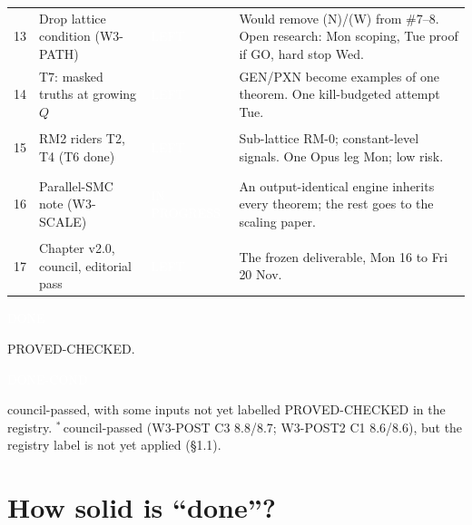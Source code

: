 \documentclass[11pt,a4paper]{article}
\newcommand{\badge}[2]{\colorbox{#1}{\textcolor{white}{\sffamily\scriptsize\bfseries\strut #2}}}
\newcommand{\DONE}{\badge{done}{DONE}}
\newcommand{\DONEC}{\badge{cond}{DONE-COND}}
\newcommand{\PROG}{\badge{prog}{IN PROGRESS}}
\newcommand{\LEFT}{\badge{left}{LEFT}}
\theoremstyle{definition}
\begin{document}
{\begin{tabularx}{\linewidth}{@{}r >{\raggedright\arraybackslash}p{4.6cm} l >{\raggedright\arraybackslash}X@{}}
13 & Drop lattice condition (W3-PATH) & \LEFT & Would remove (N)/(W) from \#7--8. Open research: Mon scoping, Tue proof if GO, hard stop Wed.\\
14 & T7: masked truths at growing $Q$ & \LEFT & GEN/PXN become examples of one theorem. One kill-budgeted attempt Tue.\\
15 & RM2 riders T2, T4 (T6 done) & \LEFT & Sub-lattice RM-0; constant-level signals. One Opus leg Mon; low risk.\\
16 & Parallel-SMC note (W3-SCALE) & \PROG & An output-identical engine inherits every theorem; the rest goes to the scaling paper.\\
17 & Chapter v2.0, council, editorial pass & \LEFT & The frozen deliverable, Mon 16 to Fri 20 Nov.\\
\bottomrule
\end{tabularx}

\smallskip
\DONE{} PROVED-CHECKED. \DONEC{} council-passed, with some inputs not yet labelled PROVED-CHECKED in the registry.
$^{\ast}$\,council-passed (W3-POST C3 8.8/8.7; W3-POST2 C1 8.6/8.6), but the registry label is not yet applied (\S1.1).}

\newpage
\section{How solid is ``done''?}
\end{document}
